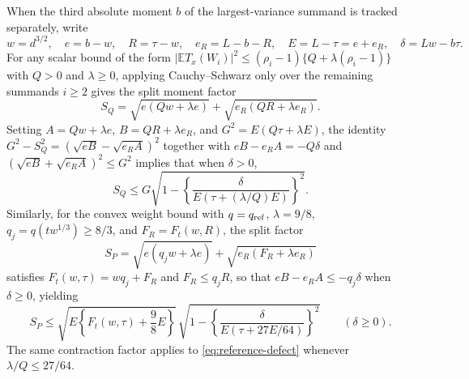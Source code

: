 \documentclass[11pt]{article}
\numberwithin{equation}{section}
\theoremstyle{remark}
\newcommand{\E}{\mathbb E}
\begin{document}
When the third absolute moment $b$ of the largest-variance summand is
tracked separately, write
\[
 w=d^{3/2},\quad e=b-w,\quad R=\tau-w,\quad
 e_R=L-b-R,\quad E=L-\tau=e+e_R,\quad
 \delta=Lw-b\tau.
\]
For any scalar bound of the form
$|\E T_x(W_i)|^2\le(\rho_i-1)\{Q+\lambda(\rho_i-1)\}$ with $Q>0$ and
$\lambda\ge0$, applying Cauchy--Schwarz only over the remaining summands
$i\ge2$ gives the split moment factor
\begin{equation}\label{eq:split-reference}
 S_Q=\sqrt{e(Qw+\lambda e)}
       +\sqrt{e_R(QR+\lambda e_R)}.
\end{equation}
Setting $A=Qw+\lambda e$, $B=QR+\lambda e_R$, and $G^2=E(Q\tau+\lambda E)$,
the identity $G^2-S_Q^2=(\sqrt{eB}-\sqrt{e_RA})^2$ together with
$eB-e_RA=-Q\delta$ and $(\sqrt{eB}+\sqrt{e_RA})^2\le G^2$ implies that when
$\delta>0$,
\begin{equation}\label{eq:reference-defect}
 S_Q\le G\sqrt{1-
       \left\{\frac{\delta}{E(\tau+(\lambda/Q)E)}\right\}^2}.
\end{equation}
Similarly, for the convex weight bound with $q=q_{\rm ref}$, $\lambda=9/8$,
$q_j=q(tw^{1/3})\ge8/3$, and $F_R=F_t(w,R)$, the split factor
\begin{equation}\label{eq:split-packed-reference}
 S_P=\sqrt{e(q_jw+\lambda e)}
       +\sqrt{e_R(F_R+\lambda e_R)}
\end{equation}
satisfies $F_t(w,\tau)=wq_j+F_R$ and $F_R\le q_jR$, so that
$eB-e_RA\le-q_j\delta$ when $\delta\ge0$, yielding
\begin{equation}\label{eq:packed-reference-defect}
 S_P\le
 \sqrt{E\left\{F_t(w,\tau)+\frac98E\right\}}\,
 \sqrt{1-\left\{\frac{\delta}{E(\tau+27E/64)}\right\}^2}
 \qquad(\delta\ge0).
\end{equation}
The same contraction factor applies to \eqref{eq:reference-defect} whenever
$\lambda/Q\le27/64$.
\end{document}

